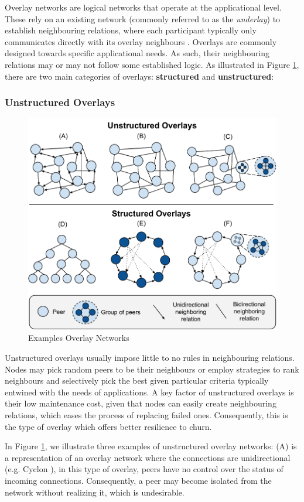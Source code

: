Overlay networks are logical networks that operate at the applicational level. These rely on an existing network (commonly referred to as the \textit{underlay}) to establish neighbouring relations, where each participant typically only communicates directly with its overlay neighbours \cite{leitaoPHDthesis}. Overlays are commonly designed towards specific applicational needs. As such, their neighbouring relations may or may not follow some established logic. As illustrated in Figure \ref{fig:overlay_networks}, there are two main categories of overlays: \textbf{structured} and \textbf{unstructured}:

\subsubsection*{Unstructured Overlays}

\begin{figure}
    \centering
    \includegraphics[width=0.60\linewidth]{Chapters/Figures/overlay_networks.pdf}
    \caption{Examples Overlay Networks}
    \label{fig:overlay_networks}
\end{figure}

Unstructured overlays usually impose little to no rules in neighbouring relations. Nodes may pick random peers to be their neighbours or employ strategies to rank neighbours and selectively pick the best given particular criteria typically entwined with the needs of applications. A key factor of unstructured overlays is their low maintenance cost, given that nodes can easily create neighbouring relations, which eases the process of replacing failed ones. Consequently, this is the type of overlay which offers better resilience to churn.

In Figure \ref{fig:overlay_networks}, we illustrate three examples of unstructured overlay networks: (A) is a representation of an overlay network where the connections are unidirectional (e.g. Cyclon \cite{jelasity2007gossip}), in this type of overlay, peers have no control over the status of incoming connections. Consequently, a peer may become isolated from the network without realizing it, which is undesirable. 

